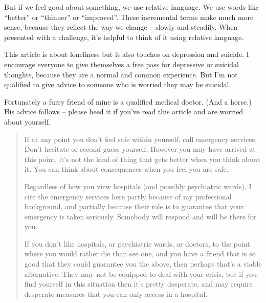 But if we feel good about something, we use relative language. We use words like ``better'' or ``thinner'' or ``improved''. These incremental terms make much more sense, because they reflect the way we change -- slowly and steadily. When presented with a challenge, it's helpful to think of it using relative language.

This article is about loneliness but it also touches on depression and suicide. I encourage everyone to give themselves a free pass for depressive or suicidal thoughts, because they are a normal and common experience. But I'm not qualified to give advice to someone who is worried they may be suicidal.

Fortunately a furry friend of mine is a qualified medical doctor. (And a horse.) His advice follows -- please heed it if you've read this article and are worried about yourself.

\begin{quotation}
  If at any point you don't feel safe within yourself, call emergency services. Don't hesitate or second-guess yourself. However you may have arrived at this point, it's not the kind of thing that gets better when you think about it. You can think about consequences when you feel you are safe.

  Regardless of how you view hospitals (and possibly psychiatric wards), I cite the emergency services here partly because of my professional background, and partially because their role is to guarantee that your emergency is taken seriously. Somebody will respond and will be there for you.

  If you don't like hospitals, or psychiatric wards, or doctors, to the point where you would rather die than see one, and you have a friend that is so good that they could guarantee you the above, then perhaps that's a viable alternative. They may not be equipped to deal with your crisis, but if you find yourself in this situation then it's pretty desperate, and may require desperate measures that you can only access in a hospital.
\end{quotation}
